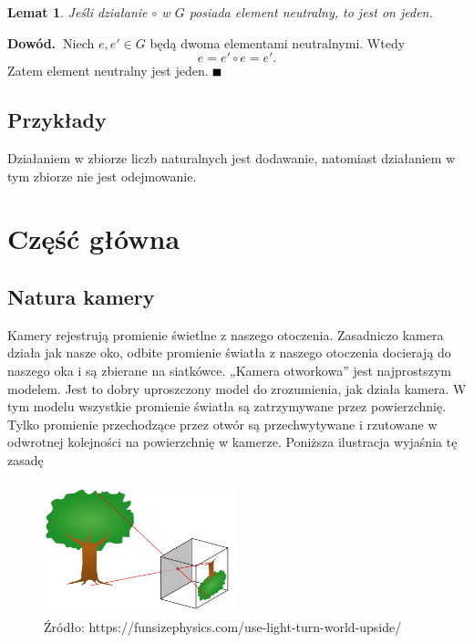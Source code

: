 \documentclass[magisterska]{pracadypl}
\def\pd{\noindent \textbf{Dowód.~}} %
\def\kd{\hfill\mbox{$\rule{2mm}{2mm}$}} %
\newtheorem{lem}{Lemat}[section]
\begin{document}
  \begin{lem}\label{lem:element_neutralny}
  Jeśli działanie $\circ$ w $G$ posiada element neutralny, to jest on jeden.
  \end{lem}
  \pd Niech $e,e'\in G$ będą dwoma elementami neutralnymi. Wtedy
  \begin{equation}\label{eq:element_neutralny}
  e=e'\circ e=e'.
  \end{equation}
  Zatem element neutralny jest jeden. \kd


  \section{Przykłady}

  Działaniem w zbiorze liczb naturalnych jest dodawanie, natomiast działaniem w tym zbiorze nie jest odejmowanie.


\chapter{Część główna}

\section{Natura kamery}

Kamery rejestrują promienie świetlne z naszego otoczenia. Zasadniczo kamera działa jak
nasze oko, odbite promienie światła z naszego otoczenia docierają do naszego oka i są zbierane na siatkówce.
„Kamera otworkowa” jest najprostszym modelem. Jest to dobry uproszczony model do zrozumienia, jak działa kamera. W tym modelu wszystkie promienie światła są zatrzymywane przez powierzchnię. Tylko promienie przechodzące przez otwór są przechwytywane i rzutowane w odwrotnej kolejności na powierzchnię w kamerze. Poniższa ilustracja wyjaśnia tę zasadę

\begin{figure}[h]  %
    \centering  %
    \includegraphics[width=0.5\textwidth]{images/light.png}  %
    \captionsetup{labelformat=empty, font=footnotesize}
    \caption{Źródło: https://funsizephysics.com/use-light-turn-world-upside/}
    \label{fig:rpi}  %
\end{figure}
\end{document}

